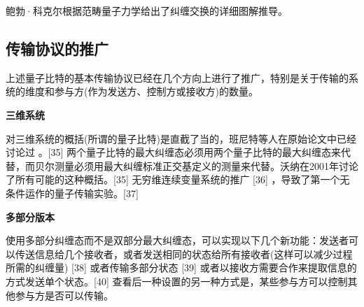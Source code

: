 鲍勃·科克尔根据范畴量子力学给出了纠缠交换的详细图解推导。

\subsection{传输协议的推广}

上述量子比特的基本传输协议已经在几个方向上进行了推广，特别是关于传输的系统的维度和参与方(作为发送方、控制方或接收方)的数量。

\textbf{三维系统}

对三维系统的概括(所谓的量子比特)是直截了当的，班尼特等人在原始论文中已经讨论过 。[35] 两个量子比特的最大纠缠态必须用两个量子比特的最大纠缠态来代替，而贝尔测量必须用最大纠缠标准正交基定义的测量来代替。沃纳在2001年讨论了所有可能的这种概括。[35] 无穷维连续变量系统的推广 [36] ，导致了第一个无条件运作的量子传输实验。[37]

\textbf{多部分版本}

使用多部分纠缠态而不是双部分最大纠缠态，可以实现以下几个新功能：发送者可以传送信息给几个接收者，或者发送相同的状态给所有接收者(这样可以减少过程所需的纠缠量) [38] 或者传输多部分状态 [39] 或者以接收方需要合作来提取信息的方式发送单个状态。[40] 查看后一种设置的另一种方式是，某些参与方可以控制其他参与方是否可以传输。